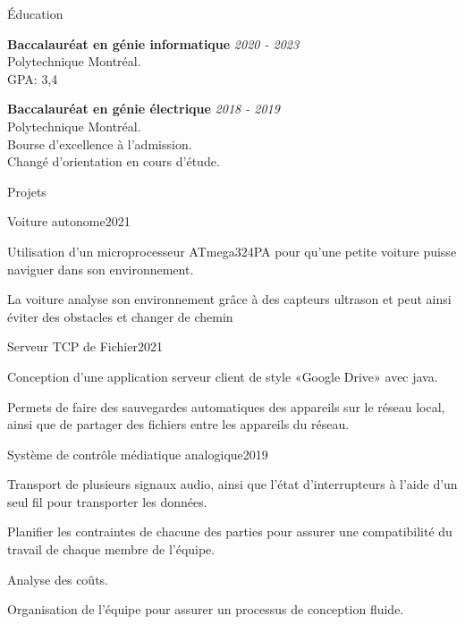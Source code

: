 \documentclass[french,12pt]{resume} %
\begin{document}
	
	
	\begin{rSection}{Éducation}
		
		{\bf Baccalauréat en génie informatique} \hfill {\em  2020 - 2023} 
		\\ Polytechnique Montréal.
		\\GPA: 3,4 
		
		
		{\bf Baccalauréat en génie électrique} \hfill {\em  2018 - 2019} 
		\\ Polytechnique Montréal.
		\\ Bourse d'excellence à l'admission.
		\\ Changé d'orientation en cours d'étude.
		
	\end{rSection}
	
	
	\begin{rSection}{Projets}

		 \begin{rSubsection}{Voiture autonome}{2021}{}{}
			\item Utilisation d'un microprocesseur ATmega324PA pour qu'une petite voiture puisse naviguer dans son environnement.
			\item La voiture analyse son environnement grâce à des capteurs ultrason et peut ainsi éviter des obstacles et changer de chemin
			 
		 \end{rSubsection}


		\begin{rSubsection}{Serveur TCP de Fichier}{2021}{}{}
			\item Conception d'une application serveur client de style «Google Drive» avec java.
			\item Permets de faire des sauvegardes automatiques des appareils sur le réseau local, ainsi que de partager des fichiers entre les appareils du réseau.
		\end{rSubsection}
		
		\begin{rSubsection}{Système de contrôle médiatique analogique}{2019}{}{}
			\item   Transport de plusieurs signaux audio, ainsi que l'état d'interrupteurs à l'aide d'un seul fil pour transporter les données.
			\item Planifier les contraintes de chacune des parties pour assurer une compatibilité du travail de chaque membre de l'équipe.
			\item \item  Analyse des coûts.
			\item Organisation de l'équipe pour assurer un processus de conception fluide.
		\end{rSubsection}


\end{rSection}
\end{document}
